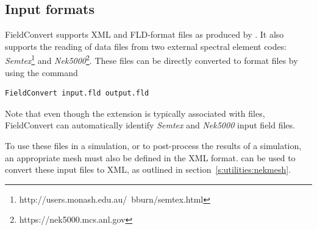 \subsection{Input formats}

FieldConvert supports XML and FLD-format files as produced by \nekpp. It also
supports the reading of data files from two external spectral element codes:
\emph{Semtex}\footnote{http://users.monash.edu.au/~bburn/semtex.html} and
\emph{Nek5000}\footnote{https://nek5000.mcs.anl.gov}. These files can be
directly converted to \nekpp format files by using the command
%
\begin{lstlisting}[style=BashInputStyle]
  FieldConvert input.fld output.fld
\end{lstlisting}
%
Note that even though the  extension is typically associated with
\nekpp files, FieldConvert can automatically identify \emph{Semtex} and
\emph{Nek5000} input field files.

To use these files in a simulation, or to post-process the results of a
simulation, an appropriate mesh must also be defined in the \nekpp XML format.
\nm can be used to convert these input files to XML, as outlined in
section~\ref{s:utilities:nekmesh}.

